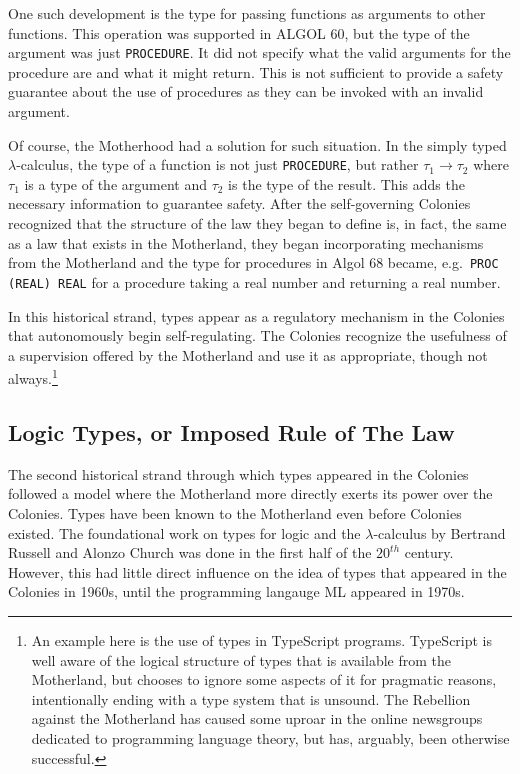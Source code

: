 \documentclass[]{article}
\begin{document}
One such development is the type for passing functions as arguments to other functions. This operation was supported in ALGOL 60, but the type of the argument was just \texttt{PROCEDURE}. It did not specify what the valid arguments for the procedure are and what it might return. This is not sufficient to provide a safety guarantee about the use of procedures as they can be invoked with an invalid argument.

Of course, the Motherhood had a solution for such situation. In the simply typed $\lambda$-calculus, the type of a function is not just \texttt{PROCEDURE}, but rather $\tau_1 \rightarrow \tau_2$ where $\tau_1$ is a type of the argument and $\tau_2$ is the type of the result. This adds the necessary information to guarantee safety. After the self-governing Colonies recognized that the structure of the law they began to define is, in fact, the same as a law that exists in the Motherland, they began incorporating mechanisms from the Motherland and the type for procedures in Algol 68 became, e.g.~\texttt{PROC (REAL) REAL} for a procedure taking a real number and returning a real number.

In this historical strand, types appear as a regulatory mechanism in the Colonies that autonomously begin self-regulating. The Colonies recognize the usefulness of a supervision offered by the Motherland and use it as appropriate, though not always.\footnote{An example here is the use of types in TypeScript programs. TypeScript is well aware of the logical structure of types that is available from the Motherland, but chooses to ignore some aspects of it for pragmatic reasons, intentionally ending with a type system that is unsound. The Rebellion against the Motherland has caused some uproar in the online newsgroups dedicated to programming language theory, but has, arguably, been otherwise successful.}

\subsection{Logic Types, or Imposed Rule of The Law}

The second historical strand through which types appeared in the Colonies followed a model where the Motherland more directly exerts its power over the Colonies. Types have been known to the Motherland even before Colonies existed. The foundational work on types for logic and the $\lambda$-calculus by Bertrand Russell and Alonzo Church was done in the first half of the $20^{th}$ century. However, this had little direct influence on the idea of types that appeared in the Colonies in 1960s, until the programming langauge ML appeared in 1970s.
\end{document}
